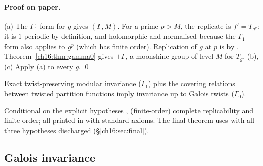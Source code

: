 \paragraph{Proof on paper.}  (a) The $\Gamma_1$ form for $g$ gives $(\Gamma,M)$.  For a prime $p>M$, the replicate is
$f'=T_{g^p}$: it is $1$-periodic by definition, and holomorphic and normalised because the $\Gamma_1$ form also applies
to $g^p$ (which has finite order).  Replication of $g$ at $p$ is  by .
Theorem~\ref{ch16:thm:gamma0} gives $\pm\Gamma$, a moonshine group of level $M$ for $T_g$.  (b), (c) Apply (a) to every
$g$. \qed
\begin{physics}
Exact twist-preserving modular invariance ($\Gamma_1$) plus the covering relations between twisted partition functions
imply invariance up to Galois twists ($\Gamma_0$).
\end{physics}
\begin{status}
Conditional on the explicit hypotheses , (finite-order) complete replicability and finite
order; all printed in  with standard axioms.  The final theorem
 uses  with all three hypotheses discharged (\S\ref{ch16:sec:final}).
\end{status}

\subsection{Galois invariance}

